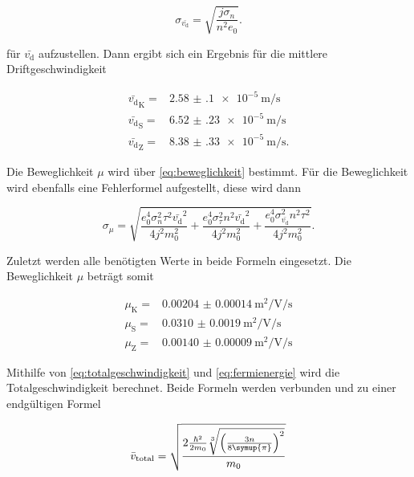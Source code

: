 \begin{equation}
    \sigma _{\bar{v_\text{d}}} = \sqrt{\frac{j \sigma _n}{n^2 e_0}}.
    \label{eq:vd_fehler}
\end{equation}

für $\bar{v_\text{d}}$ aufzustellen.
Dann ergibt sich ein Ergebnis für die mittlere Driftgeschwindigkeit 

\begin{align}
    \bar{v_\text{d}}_\text{K} =& \SI{2.58(10)e-5}{\meter\per\second} \\
    \bar{v_\text{d}}_\text{S} =& \SI{6.52(23)e-5}{\meter\per\second} \\
    \bar{v_\text{d}}_\text{Z} =& \SI{8.38(33)e-5}{\meter\per\second}.
    \label{eq:vd1}
\end{align}

Die Beweglichkeit $\mu$ wird über \autoref{eq:beweglichkeit} bestimmt.
Für die Beweglichkeit wird ebenfalls eine Fehlerformel aufgestellt, diese wird dann

\begin{equation}
    \sigma _{\mu} = \sqrt{\frac{e_{0}^{4} \sigma_{n}^{2} \tau^{2} {\bar{v_\text{d}}}^{2}}{4 j^{2} m_{0}^{2}} + \frac{e_{0}^{4} \sigma_{\tau}^{2} n^{2} {\bar{v_\text{d}}}^{2}}{4 j^{2} m_{0}^{2}} + \frac{e_{0}^{4} \sigma_{\bar{v_\text{d}}}^{2} n^{2} \tau^{2}}{4 j^{2} m_{0}^{2}}}.
    \label{eq:bewegl_fehler}
\end{equation}

Zuletzt werden alle benötigten Werte in beide Formeln eingesetzt.
Die Beweglichkeit $\mu$ beträgt somit

\begin{align}
    \mu _\text{K} =& \SI{0.00204(14)}{\meter\squared\per\volt\per\second}\\
    \mu _\text{S} =& \SI{0.0310(19)}{\meter\squared\per\volt\per\second}\\
    \mu _\text{Z} =& \SI{0.00140(9)}{\meter\squared\per\volt\per\second}
    \label{eq:mue1}
\end{align}

Mithilfe von \autoref{eq:totalgeschwindigkeit} und \autoref{eq:fermienergie} wird die Totalgeschwindigkeit berechnet.
Beide Formeln werden verbunden und zu einer endgültigen Formel

\begin{equation}
    \bar{v}_\text{total} = \sqrt{\frac{2 \frac{\hbar^2}{2 m_0}\sqrt[3]{\left(\frac{3n}{8\symup{\pi}}\right)^2}}{m_0}}
    \label{eq:totalgeschw.}
\end{equation}

